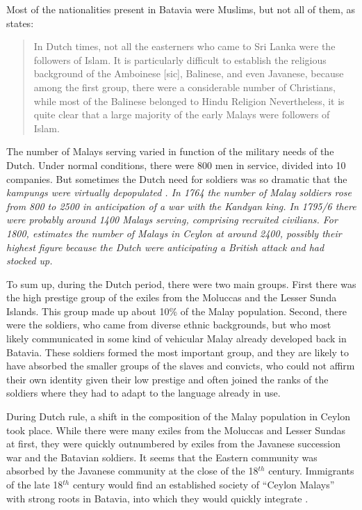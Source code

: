 Most of the nationalities present in Batavia were Muslims, but not all of them, as  \citet[58]{Hussainmiya1987} states:

\begin{quote}
    In Dutch times, not all the easterners who came to Sri Lanka were the followers of Islam. It is particularly difficult to establish the religious background of the Amboinese [sic], Balinese, and even Javanese, because among the first group, there  were a considerable number of Christians, while most of the Balinese belonged to Hindu Religion \el Nevertheless, it is quite clear that a large majority of the early Malays were followers of Islam. \citep[58]{Hussainmiya1987}
\end{quote}

The number of Malays serving varied in function of the military needs of the Dutch. Under normal conditions, there were 800 men in service, divided into 10 companies.  But sometimes the Dutch need for soldiers was so dramatic that the \em kampungs \em
were virtually depopulated \citep[56]{Hussainmiya1987}. In 1764 the number of Malay soldiers rose from 800 to 2500 in anticipation of a war with the Kandyan king. In 1795/6 there were probably around 1400 Malays serving, comprising recruited
civilians. For 1800, \citet[49f]{Hussainmiya1990} estimates the number of Malays in Ceylon  at around 2400, possibly their highest figure \citep[54]{Hussainmiya1987} because the Dutch were anticipating a British attack and had stocked up.
 
 
To sum up, during the Dutch period, there were two main groups. First there was the high prestige group of the exiles from the Moluccas and the Lesser Sunda Islands. This group made up about 10\% of the Malay population. Second, there were the soldiers, who came from diverse ethnic backgrounds, but who most likely communicated in some kind of vehicular Malay already developed back in Batavia. These soldiers formed the most important group, and they are likely to have absorbed the smaller groups of the slaves and convicts, who could not affirm their own identity given their low prestige and often joined the ranks of the soldiers where they had to adapt to the language already in use.



During Dutch rule, a shift in the composition of the Malay population in Ceylon took place. While there were many exiles from the Moluccas and Lesser Sundas at first, they were quickly outnumbered by exiles from the Javanese succession war and the Batavian soldiers. It seems that the Eastern community was absorbed by the Javanese community at the close of the 18$^{th}$ century.  Immigrants of the late 18$^{th}$ century would find an established society of ``Ceylon Malays'' with strong roots in Batavia, into which they would quickly integrate \citep[55-57]{Hussainmiya1987}.


